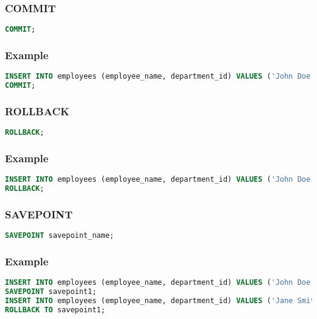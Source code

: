 \documentclass{article}
\begin{document}
\subsubsection{COMMIT}
\begin{lstlisting}[language=SQL]
COMMIT;
\end{lstlisting}

\subsubsection{Example}
\begin{lstlisting}[language=SQL]
INSERT INTO employees (employee_name, department_id) VALUES ('John Doe', 1);
COMMIT;
\end{lstlisting}

\subsubsection{ROLLBACK}
\begin{lstlisting}[language=SQL]
ROLLBACK;
\end{lstlisting}

\subsubsection{Example}
\begin{lstlisting}[language=SQL]
INSERT INTO employees (employee_name, department_id) VALUES ('John Doe', 1);
ROLLBACK;
\end{lstlisting}

\subsubsection{SAVEPOINT}
\begin{lstlisting}[language=SQL]
SAVEPOINT savepoint_name;
\end{lstlisting}

\subsubsection{Example}
\begin{lstlisting}[language=SQL]
INSERT INTO employees (employee_name, department_id) VALUES ('John Doe', 1);
SAVEPOINT savepoint1;
INSERT INTO employees (employee_name, department_id) VALUES ('Jane Smith', 2);
ROLLBACK TO savepoint1;
\end{lstlisting}
\end{document}
